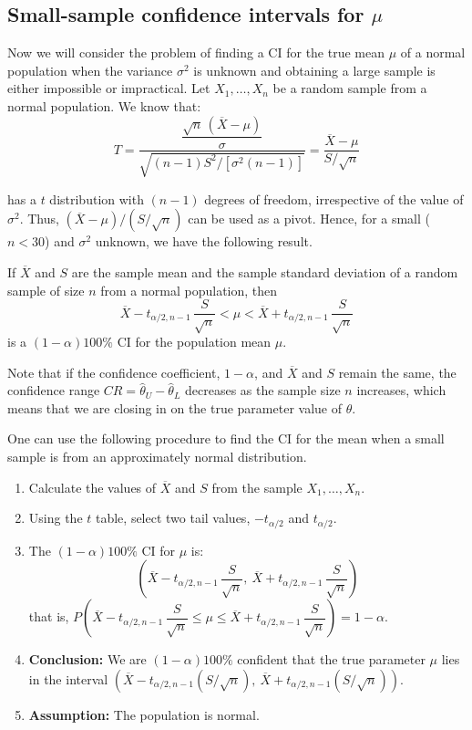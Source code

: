 \subsection{Small-sample confidence intervals for $\mu$}

Now we will consider the problem of finding a CI for the true mean $\mu$ of a normal population when the variance $\sigma^2$ is unknown and obtaining a large sample is either impossible or impractical. Let $X_1, \ldots, X_n$ be a random sample from a normal population. We know that:
\[
T = \frac{\dfrac{\sqrt{n}\,(\overline{X} - \mu)}{\sigma}}{\sqrt{(n-1)S^2/[\sigma^2(n-1)]}} = \frac{\overline{X} - \mu}{S/\sqrt{n}}
\]

has a $t$ distribution with $(n-1)$ degrees of freedom, irrespective of the value of $\sigma^2$. Thus, $(\overline{X} - \mu)/(S/\sqrt{n})$ can be used as a pivot. Hence, for a small ($n < 30$) and $\sigma^2$ unknown, we have the following result.

\begin{theorem}[5.5.1]
If $\overline{X}$ and $S$ are the sample mean and the sample standard deviation of a random sample of size $n$ from a normal population, then
\[
\overline{X} - t_{\alpha/2,n-1}\,\frac{S}{\sqrt{n}} < \mu < \overline{X} + t_{\alpha/2,n-1}\,\frac{S}{\sqrt{n}}
\]
is a $(1 - \alpha)100\%$ CI for the population mean $\mu$.
\end{theorem}

Note that if the confidence coefficient, $1 - \alpha$, and $\overline{X}$ and $S$ remain the same, the confidence range $CR = \hat{\theta}_U - \hat{\theta}_L$ decreases as the sample size $n$ increases, which means that we are closing in on the true parameter value of $\theta$.

One can use the following procedure to find the CI for the mean when a small sample is from an approximately normal distribution.

\begin{tcolorbox}[title=Procedure to find small-sample confidence interval for $\mu$]
\begin{enumerate}
    \item Calculate the values of $\overline{X}$ and $S$ from the sample $X_1, \ldots, X_n$.
    \item Using the $t$ table, select two tail values, $-t_{\alpha/2}$ and $t_{\alpha/2}$.
    \item The $(1 - \alpha)100\%$ CI for $\mu$ is:
    \[
    \left( \overline{X} - t_{\alpha/2,n-1}\,\frac{S}{\sqrt{n}},\ \overline{X} + t_{\alpha/2,n-1}\,\frac{S}{\sqrt{n}} \right)
    \]
    that is, $P\!\left( \overline{X} - t_{\alpha/2,n-1}\,\dfrac{S}{\sqrt{n}} \leq \mu \leq \overline{X} + t_{\alpha/2,n-1}\,\dfrac{S}{\sqrt{n}} \right) = 1 - \alpha$.
    \item \textbf{Conclusion:} We are $(1 - \alpha)100\%$ confident that the true parameter $\mu$ lies in the interval $\left( \overline{X} - t_{\alpha/2,n-1}(S/\sqrt{n}),\ \overline{X} + t_{\alpha/2,n-1}(S/\sqrt{n}) \right)$.
    \item \textbf{Assumption:} The population is normal.
\end{enumerate}
\end{tcolorbox}

